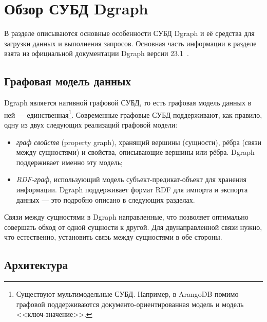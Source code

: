 
\section {Обзор СУБД Dgraph}

В разделе описываются основные особенности СУБД Dgraph и её средства для загрузки данных и выполнения
запросов. Основная часть информации в разделе взята из официальной документации Dgraph версии
23.1~\cite{dgraphDocs}.

\subsection{Графовая модель данных}

Dgraph является нативной графовой СУБД, то есть графовая модель данных в ней ---
единственная\footnote{Существуют мультимодельные СУБД. Например, в ArangoDB помимо графовой
поддерживаются документо-ориентированная модель и модель <<ключ-значение>>.}. Современные графовые
СУБД поддерживают, как правило, одну из двух следующих реализаций графовой модели:
\begin{itemize}
    \item \textit{граф свойств} (property graph), хранящий вершины (сущности), рёбра (связи между
сущностями) и свойства, описывающие вершины или рёбра. Dgraph поддерживает именно эту модель;
    \item \textit{RDF-граф}, использующий модель субъект-предикат-объект для хранения информации.
Dgraph поддерживает формат RDF для импорта и экспорта данных --- это подробно описано в следующих
разделах.
\end{itemize}

Связи между сущностями в Dgraph направленные, что позволяет оптимально совершать обход от одной
сущности к другой. Для двунаправленной связи нужно, что естественно, установить связь между
сущностями в обе стороны.

\subsection{Архитектура}

